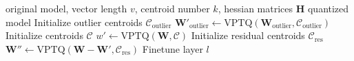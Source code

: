 \begin{algorithm}[t!]
\caption{End to End Quantization Algorithm}\label{alg:cap}
\small
\begin{algorithmic}
\Require original model, vector length $v$, centroid number $k$, hessian matrices $\mathbf{H}$
\Ensure quantized model
 
            \State Initialize outlier centroids $\mathcal{C}_{\text{outlier}}$ 
            \State $\mathbf{W}'_{\text{outlier}} \gets \text{VPTQ}(\mathbf{W}_{\text{outlier}}, \mathcal{C}_{\text{outlier}})$
        \EndIf
        \State Initialize centroids $\mathcal{C}$ 
        \State $w' \gets \text{VPTQ}(\mathbf{W}, \mathcal{C})$
            \State Initialize residual centroids $\mathcal{C}_{\text{res}}$ 
            \State $\mathbf{W}'' \gets \text{VPTQ}(\mathbf{W} - \mathbf{W}', \mathcal{C}_{\text{res}})$
        \EndIf
    \EndFor
        \State Finetune layer $l$
    \EndIf
\EndFor
\end{algorithmic}
\end{algorithm}

